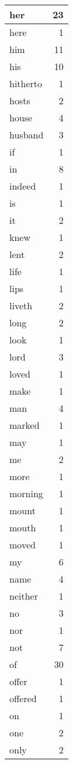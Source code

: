 \begin{center}
\begin{longtable}{l|r}
her & 23 \\ \hline
here & 1 \\ \hline
him & 11 \\ \hline
his & 10 \\ \hline
hitherto & 1 \\ \hline
hosts & 2 \\ \hline
house & 4 \\ \hline
husband & 3 \\ \hline
if & 1 \\ \hline
in & 8 \\ \hline
indeed & 1 \\ \hline
is & 1 \\ \hline
it & 2 \\ \hline
knew & 1 \\ \hline
lent & 2 \\ \hline
life & 1 \\ \hline
lips & 1 \\ \hline
liveth & 2 \\ \hline
long & 2 \\ \hline
look & 1 \\ \hline
lord & 3 \\ \hline
loved & 1 \\ \hline
make & 1 \\ \hline
man & 4 \\ \hline
marked & 1 \\ \hline
may & 1 \\ \hline
me & 2 \\ \hline
more & 1 \\ \hline
morning & 1 \\ \hline
mount & 1 \\ \hline
mouth & 1 \\ \hline
moved & 1 \\ \hline
my & 6 \\ \hline
name & 4 \\ \hline
neither & 1 \\ \hline
no & 3 \\ \hline
nor & 1 \\ \hline
not & 7 \\ \hline
of & 30 \\ \hline
offer & 1 \\ \hline
offered & 1 \\ \hline
on & 1 \\ \hline
one & 2 \\ \hline
only & 2 \\ \hline

\end{longtable}
\end{center}
